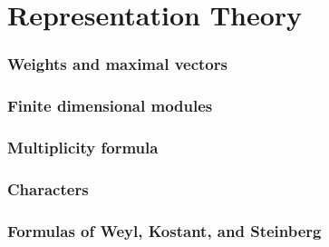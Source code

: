 \part{Representation Theory}
\section{Weights and maximal vectors}

\section{Finite dimensional modules}

\section{Multiplicity formula}

\section{Characters}

\section{Formulas of Weyl, Kostant, and Steinberg}
